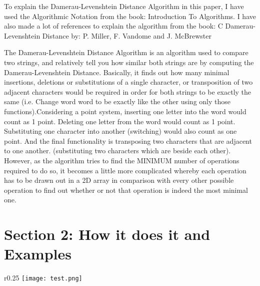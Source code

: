 \documentclass[12pt]{article}
\begin{document}
To explain the Damerau-Levenshtein Distance Algorithm in this paper, I have used the Algorithmic Notation from the book: Introduction To Algorithms.\cite{book} I have also made a lot of references to explain the algorithm from the book: C Damerau-Levenshtein Distance by: P. Miller, F. Vandome and J. McBrewster \cite{book2}


\vspace{2.5mm} %

The Damerau-Levenshtein Distance Algorithm is an algorithm used to compare two strings, and relatively tell you how similar both strings are by computing the Damerau-Levenshtein Distance. Basically, it finds out how many minimal insertions, deletions or substitutions of a single character, or transposition of two adjacent characters would be required in order for both strings to be exactly the same (i.e. Change word word to be exactly like the other using only those functions).Considering a point system, inserting one letter into the word would count as 1 point. Deleting one letter from the word would count as 1 point. Substituting one character into another (switching) would also count as one point. And the final functionality is transposing two characters that are adjacent to one another. (substituting two characters which are beside each other). However, as the algorithm tries to find the MINIMUM number of operations required to do so, it becomes a little more complicated whereby each operation has to be drawn out in a 2D array in comparison with every other possible operation to find out whether or not that operation is indeed the most minimal one.\cite{book2} 

\newpage

\section*{Section 2: How it does it and Examples}

\begin{wrapfigure}{r}{0.25\textwidth} %
    \centering
    \texttt{[image: test.png]}
\end{wrapfigure}
\end{document}
